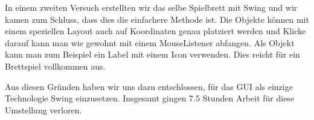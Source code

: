 \documentclass[12pt,halfparskip]{scrartcl}
\begin{document}
In einem zweiten Versuch erstellten wir das selbe Spielbrett mit Swing und wir kamen zum Schluss, dass dies die einfachere Methode ist. Die Objekte können mit einem speziellen Layout auch auf Koordinaten genau platziert werden und Klicke darauf kann man wie gewohnt mit einem MouseListener abfangen. Als Objekt kann man zum Beispiel ein Label mit einem Icon verwenden. Dies reicht für ein Brettspiel vollkommen aus.

Aus diesen Gründen haben wir uns dazu entschlossen, für das GUI als einzige Technologie Swing einzusetzen. Insgesamt gingen 7.5 Stunden Arbeit für diese Umstellung verloren.


\end{document}
